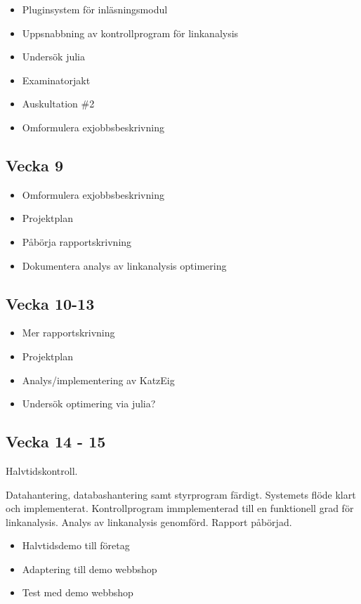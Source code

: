 \documentclass[11pt]{article}
\begin{document}
\begin{itemize}
    \item Pluginsystem för inläsningsmodul
    \item Uppsnabbning av kontrollprogram för linkanalysis
    \item Undersök julia
    \item Examinatorjakt
    \item Auskultation \#2
    \item Omformulera exjobbsbeskrivning
\end{itemize}


\subsection*{Vecka 9}

\begin{itemize}
    \item Omformulera exjobbsbeskrivning
    \item Projektplan
    \item Påbörja rapportskrivning
    \item Dokumentera analys av linkanalysis optimering
\end{itemize}


\subsection*{Vecka 10-13}

\begin{itemize}
    \item Mer rapportskrivning
    \item Projektplan
    \item Analys/implementering av KatzEig
    \item Undersök optimering via julia?
\end{itemize}


\subsection*{Vecka 14 - 15}

Halvtidskontroll.

Datahantering, databashantering samt styrprogram färdigt. Systemets flöde klart och implementerat. Kontrollprogram immplementerad till en funktionell grad för linkanalysis. Analys av linkanalysis genomförd. Rapport påbörjad.

\begin{itemize}
    \item Halvtidsdemo till företag
    \item Adaptering till demo webbshop
    \item Test med demo webbshop
\end{itemize}
\end{document}
